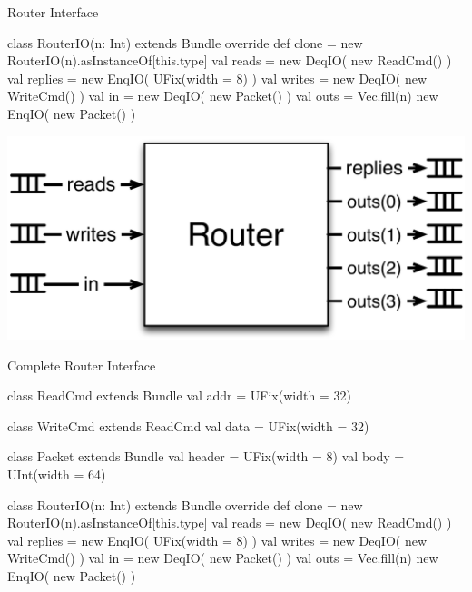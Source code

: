 \documentclass[xcolor=pdflatex,dvipsnames,table]{beamer}
\begin{document}
\begin{frame}[fragile]{Router Interface}
\begin{scala}
class RouterIO(n: Int) extends Bundle {
  override def clone = new RouterIO(n).asInstanceOf[this.type]
  val reads   = new DeqIO( new ReadCmd() )
  val replies = new EnqIO( UFix(width = 8) )
  val writes  = new DeqIO( new WriteCmd() )
  val in      = new DeqIO( new Packet() )
  val outs    = Vec.fill(n){ new EnqIO( new Packet() ) }
}
\end{scala}
\begin{center}
\includegraphics[height=0.45\textheight]{../bootcamp/figs/trouter.pdf} 
\end{center}
\end{frame}

\begin{frame}[fragile]{Complete Router Interface}

{
\begin{scala}
class ReadCmd extends Bundle {
  val addr = UFix(width = 32)
}

class WriteCmd extends ReadCmd {
  val data = UFix(width = 32)
}

class Packet extends Bundle {
  val header = UFix(width = 8)
  val body   = UInt(width = 64)
}

class RouterIO(n: Int) extends Bundle {
  override def clone = new RouterIO(n).asInstanceOf[this.type]
  val reads   = new DeqIO( new ReadCmd() )
  val replies = new EnqIO( UFix(width = 8) )
  val writes  = new DeqIO( new WriteCmd() )
  val in      = new DeqIO( new Packet() )
  val outs    = Vec.fill(n){ new EnqIO( new Packet() ) }
}
\end{scala}
}
\end{frame}
\end{document}
